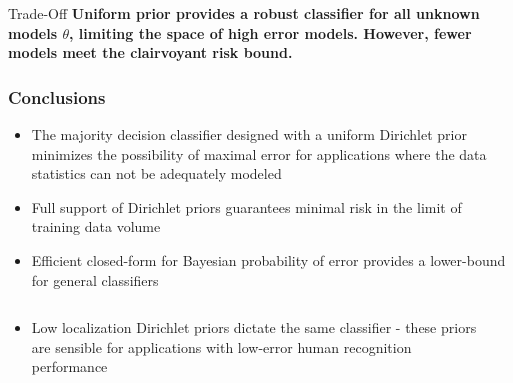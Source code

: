 \documentclass[aspectratio=169]{beamer}
\begin{document}
\begin{frame}
\begin{columns}[c]
\begin{column}{.5\linewidth}
\end{column}

\end{columns}

\vspace{-1.75em}
\begin{block}{Trade-Off}
\textbf{Uniform prior provides a robust classifier for all unknown models $\theta$, limiting the space of high error models. However, fewer models meet the clairvoyant risk bound.}
\end{block}


\end{frame}




\begin{frame}
\frametitle{Conclusions}

\begin{itemize}
\item The majority decision classifier designed with a uniform Dirichlet prior minimizes the possibility of maximal error for applications where the data statistics can not be adequately modeled
\item Full support of Dirichlet priors guarantees minimal risk in the limit of training data volume
\item Efficient closed-form for Bayesian probability of error provides a lower-bound for general classifiers
\end{itemize}

\begin{columns}[T]

\begin{column}{.55\linewidth}

\begin{itemize}
\item Low localization Dirichlet priors dictate the same classifier - these priors are sensible for applications with low-error human recognition performance
\end{itemize}

\end{column}

\begin{column}{.4\linewidth}


\end{column}
\end{columns}
\end{frame}
\end{document}
